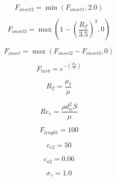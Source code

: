 {\newpage\clearpage
{}%
\begin{displaymath}
F_{onset2}=\min (F_{onset1}, 2.0)
\end{displaymath}%
\lthtmldisplayZ
\lthtmlcheckvsize\clearpage}

{\newpage\clearpage
{}%
\begin{displaymath}
F_{onset3}=\max (1-(\frac{R_{T}}{3.5})^{3}, 0)
\end{displaymath}%
\lthtmldisplayZ
\lthtmlcheckvsize\clearpage}

{\newpage\clearpage
{}%
\begin{displaymath}
    F_{onset}=\max (F_{onset2}-F_{onset3},0)
\end{displaymath}%
\lthtmldisplayZ
\lthtmlcheckvsize\clearpage}

{\newpage\clearpage
{}%
\begin{displaymath}
F_{turb}=e^{-(\frac{R_{T}}{2})}
\end{displaymath}%
\lthtmldisplayZ
\lthtmlcheckvsize\clearpage}

{\newpage\clearpage
{}%
\begin{displaymath}
R_{T}=\frac{\mu_{t}}{\mu}
\end{displaymath}%
\lthtmldisplayZ
\lthtmlcheckvsize\clearpage}

{\newpage\clearpage
{}%
\begin{displaymath}
Re_{v}=\frac{\rho d_{w}^{2}S}{\mu}
\end{displaymath}%
\lthtmldisplayZ
\lthtmlcheckvsize\clearpage}

{\newpage\clearpage
{}%
\begin{displaymath}
  F_{length}=100
\end{displaymath}%
\lthtmldisplayZ
\lthtmlcheckvsize\clearpage}

{\newpage\clearpage
{}%
\begin{displaymath}
  c_{e2}=50
\end{displaymath}%
\lthtmldisplayZ
\lthtmlcheckvsize\clearpage}

{\newpage\clearpage
{}%
\begin{displaymath}
  c_{a2}=0.06
\end{displaymath}%
\lthtmldisplayZ
\lthtmlcheckvsize\clearpage}

{\newpage\clearpage
{}%
\begin{displaymath}
  \sigma_{\gamma}=1.0  
\end{displaymath}%
\lthtmldisplayZ
\lthtmlcheckvsize\clearpage}

